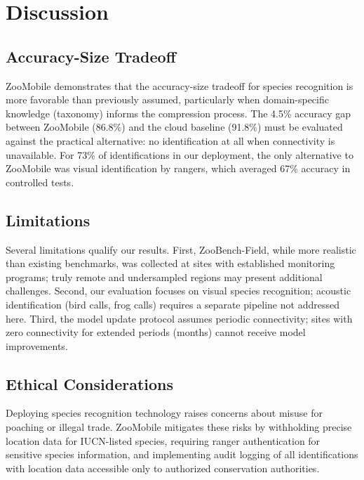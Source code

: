 \section{Discussion}

\label{sec:discussion}

\subsection{Accuracy-Size Tradeoff}

ZooMobile demonstrates that the accuracy-size tradeoff for species recognition is more favorable than previously assumed, particularly when domain-specific knowledge (taxonomy) informs the compression process.
The 4.5\% accuracy gap between ZooMobile (86.8\%) and the cloud baseline (91.8\%) must be evaluated against the practical alternative: no identification at all when connectivity is unavailable.
For 73\% of identifications in our deployment, the only alternative to ZooMobile was visual identification by rangers, which averaged 67\% accuracy in controlled tests.

\subsection{Limitations}

Several limitations qualify our results.
First, ZooBench-Field, while more realistic than existing benchmarks, was collected at sites with established monitoring programs; truly remote and undersampled regions may present additional challenges.
Second, our evaluation focuses on visual species recognition; acoustic identification (bird calls, frog calls) requires a separate pipeline not addressed here.
Third, the model update protocol assumes periodic connectivity; sites with zero connectivity for extended periods (months) cannot receive model improvements.

\subsection{Ethical Considerations}

Deploying species recognition technology raises concerns about misuse for poaching or illegal trade.
ZooMobile mitigates these risks by withholding precise location data for IUCN-listed species, requiring ranger authentication for sensitive species information, and implementing audit logging of all identifications with location data accessible only to authorized conservation authorities.

